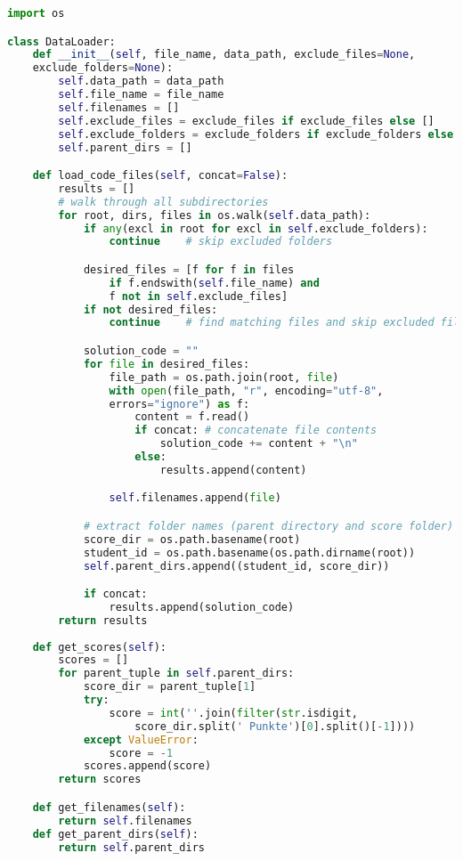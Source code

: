\begin{lstlisting}[language=Python, caption={\texttt{data\_loader.py}}, label={prco:data-loader}]
import os

class DataLoader:
    def __init__(self, file_name, data_path, exclude_files=None, 
    exclude_folders=None):
        self.data_path = data_path
        self.file_name = file_name
        self.filenames = []
        self.exclude_files = exclude_files if exclude_files else []
        self.exclude_folders = exclude_folders if exclude_folders else []
        self.parent_dirs = []

    def load_code_files(self, concat=False):
        results = []
        # walk through all subdirectories
        for root, dirs, files in os.walk(self.data_path):
            if any(excl in root for excl in self.exclude_folders):
                continue    # skip excluded folders

            desired_files = [f for f in files 
                if f.endswith(self.file_name) and 
                f not in self.exclude_files]
            if not desired_files:
                continue    # find matching files and skip excluded files

            solution_code = ""
            for file in desired_files:
                file_path = os.path.join(root, file)
                with open(file_path, "r", encoding="utf-8", 
                errors="ignore") as f:
                    content = f.read()
                    if concat: # concatenate file contents
                        solution_code += content + "\n"
                    else:
                        results.append(content)

                self.filenames.append(file)

            # extract folder names (parent directory and score folder)
            score_dir = os.path.basename(root)
            student_id = os.path.basename(os.path.dirname(root))
            self.parent_dirs.append((student_id, score_dir))

            if concat:
                results.append(solution_code)
        return results
    
    def get_scores(self):
        scores = []
        for parent_tuple in self.parent_dirs:
            score_dir = parent_tuple[1]
            try:
                score = int(''.join(filter(str.isdigit, 
                    score_dir.split(' Punkte')[0].split()[-1])))
            except ValueError:
                score = -1
            scores.append(score)
        return scores

    def get_filenames(self):
        return self.filenames
    def get_parent_dirs(self):
        return self.parent_dirs
\end{lstlisting}


